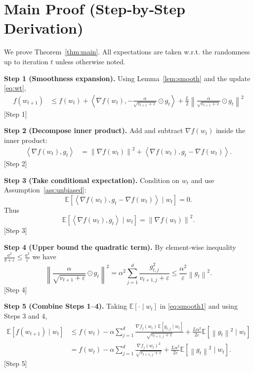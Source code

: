 \documentclass{article}
\newcommand{\E}{\mathbb{E}}
\newcommand{\norm}[1]{\left\|#1\right\|}
\begin{document}
\section*{Main Proof (Step‑by‑Step Derivation)}
We prove Theorem~\ref{thm:main}. All expectations are taken w.r.t. the randomness up to iteration $t$ unless otherwise noted.

\bigskip
\noindent\textbf{Step 1 (Smoothness expansion).}  
Using Lemma~\ref{lem:smooth} and the update \eqref{eq:wt},
\begin{align}
f(w_{t+1}) &\le f(w_{t})+\left\langle\nabla f(w_{t}),-\frac{\alpha}{\sqrt{v_{t+1}+\varepsilon}}\odot g_{t}\right\rangle
            +\frac{L}{2}\norm{\frac{\alpha}{\sqrt{v_{t+1}+\varepsilon}}\odot g_{t}}^{2}\label{eq:smooth1}
\end{align}
[Step 1]

\noindent\textbf{Step 2 (Decompose inner product).}  
Add and subtract $\nabla f(w_{t})$ inside the inner product:
\begin{align}
\left\langle\nabla f(w_{t}),g_{t}\right\rangle
&= \norm{\nabla f(w_{t})}^{2}
   +\left\langle\nabla f(w_{t}),g_{t}-\nabla f(w_{t})\right\rangle.\label{eq:decomp}
\end{align}
[Step 2]

\noindent\textbf{Step 3 (Take conditional expectation).}  
Condition on $w_{t}$ and use Assumption~\ref{ass:unbiased}:
\[
\E\!\left[\left\langle\nabla f(w_{t}),g_{t}-\nabla f(w_{t})\right\rangle\mid w_{t}\right]=0.
\]
Thus
\[
\E\!\left[\left\langle\nabla f(w_{t}),g_{t}\right\rangle\mid w_{t}\right]=\norm{\nabla f(w_{t})}^{2}.
\]
[Step 3]

\noindent\textbf{Step 4 (Upper bound the quadratic term).}  
By element‑wise inequality $\frac{a^{2}}{b+\varepsilon}\le\frac{a^{2}}{\varepsilon}$ we have
\[
\norm{\frac{\alpha}{\sqrt{v_{t+1}+\varepsilon}}\odot g_{t}}^{2}
 =\alpha^{2}\sum_{j=1}^{d}\frac{g_{t,j}^{2}}{v_{t+1,j}+\varepsilon}
 \le\frac{\alpha^{2}}{\varepsilon}\norm{g_{t}}^{2}.
\]
[Step 4]

\noindent\textbf{Step 5 (Combine Steps 1–4).}  
Taking $\E[\cdot\mid w_{t}]$ in \eqref{eq:smooth1} and using Steps 3 and 4,
\begin{align}
\E\!\left[f(w_{t+1})\mid w_{t}\right]
&\le f(w_{t})-\alpha\sum_{j=1}^{d}\frac{\nabla f_{j}(w_{t})\,\E[g_{t,j}\mid w_{t}]}{\sqrt{v_{t+1,j}+\varepsilon}}
   +\frac{L\alpha^{2}}{2\varepsilon}\E\!\left[\norm{g_{t}}^{2}\mid w_{t}\right]\nonumber\\
&= f(w_{t})-\alpha\sum_{j=1}^{d}\frac{\nabla f_{j}(w_{t})^{2}}{\sqrt{v_{t+1,j}+\varepsilon}}
   +\frac{L\alpha^{2}}{2\varepsilon}\E\!\left[\norm{g_{t}}^{2}\mid w_{t}\right].\label{eq:mid}
\end{align}
[Step 5]
\end{document}
